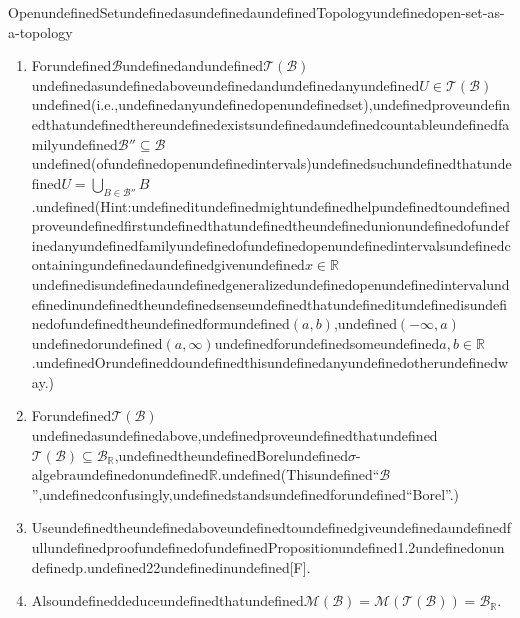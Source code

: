 \begin{mystexercise}{OpenundefinedSetundefinedasundefinedaundefinedTopologyundefined}{open-set-as-a-topology}
\begin{enumerate}
\item Forundefined$\mathcal{B}$undefinedandundefined$\mathcal{T}(\mathcal{B})$undefinedasundefinedaboveundefinedandundefinedanyundefined$U \in \mathcal{T}(\mathcal{B})$undefined(i.e.,undefinedanyundefinedopenundefinedset),undefinedproveundefinedthatundefinedthereundefinedexistsundefinedaundefinedcountableundefinedfamilyundefined$\mathcal{B}'' \subseteq \mathcal{B}$undefined(ofundefinedopenundefinedintervals)undefinedsuchundefinedthatundefined$U = \bigcup_{B \in \mathcal{B}''} B$.undefined(Hint:undefineditundefinedmightundefinedhelpundefinedtoundefinedproveundefinedfirstundefinedthatundefinedtheundefinedunionundefinedofundefinedanyundefinedfamilyundefinedofundefinedopenundefinedintervalsundefinedcontainingundefinedaundefinedgivenundefined$x \in \mathbb{R}$undefinedisundefinedaundefinedgeneralizedundefinedopenundefinedintervalundefinedinundefinedtheundefinedsenseundefinedthatundefineditundefinedisundefinedofundefinedtheundefinedformundefined$(a, b)$,undefined$( -\infty, a)$undefinedorundefined$(a, \infty)$undefinedforundefinedsomeundefined$a, b \in \mathbb{R}$.undefinedOrundefineddoundefinedthisundefinedanyundefinedotherundefinedway.)
\item Forundefined$\mathcal{T}(\mathcal{B})$undefinedasundefinedabove,undefinedproveundefinedthatundefined$\mathcal{T}(\mathcal{B}) \subseteq \mathcal{B}_{\mathbb{R}}$,undefinedtheundefinedBorelundefined$\sigma$-algebraundefinedonundefined$\mathbb{R}$.undefined(Thisundefined``$\mathcal{B}$'',undefinedconfusingly,undefinedstandsundefinedforundefined``Borel''.)
\item UseundefinedtheundefinedaboveundefinedtoundefinedgiveundefinedaundefinedfullundefinedproofundefinedofundefinedPropositionundefined1.2undefinedonundefinedp.undefined22undefinedinundefined[F].
\item Alsoundefineddeduceundefinedthatundefined$\mathcal{M}(\mathcal{B}) = \mathcal{M}(\mathcal{T}(\mathcal{B})) = \mathcal{B}_{\mathbb{R}}$.
\end{enumerate}

\end{mystexercise}
